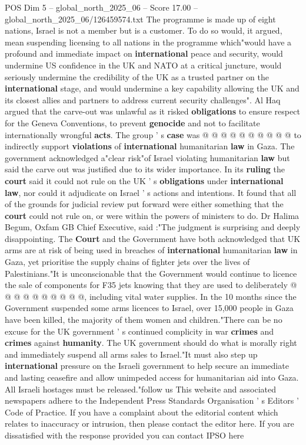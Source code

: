 \begin{textsample}{POS Dim 5 – global\_north\_2025\_06 – Score 17.00 – global\_north\_2025\_06/126459574.txt}
The programme is made up of eight nations, Israel is not a member but is a customer.
To do so would, it argued, mean suspending licensing to all nations in the programme which"would have a profound and immediate impact on \textbf{international} peace and security, would undermine US confidence in the UK and NATO at a critical juncture, would seriously undermine the credibility of the UK as a trusted partner on the \textbf{international} stage, and would undermine a key capability allowing the UK and its closest allies and partners to address current security challenges".
Al Haq argued that the carve-out was unlawful as it risked \textbf{obligations} to ensure respect for the Geneva Conventions, to prevent \textbf{genocide} and not to facilitate internationally wrongful \textbf{acts}.
The group ' s \textbf{case} was @ @ @ @ @ @ @ @ @ @ to indirectly support \textbf{violations} of \textbf{international} humanitarian \textbf{law} in Gaza.
The government acknowledged a"clear risk"of Israel violating humanitarian \textbf{law} but said the carve out was justified due to its wider importance.
In its \textbf{ruling} the \textbf{court} said it could not rule on the UK ' s \textbf{obligations} under \textbf{international} \textbf{law}, nor could it adjudicate on Israel ' s actions and intentions.
It found that all of the grounds for judicial review put forward were either something that the \textbf{court} could not rule on, or were within the powers of ministers to do.
Dr Halima Begum, Oxfam GB Chief Executive, said :"The judgment is surprising and deeply disappointing.
The \textbf{Court} and the Government have both acknowledged that UK arms are at risk of being used in breaches of \textbf{international} humanitarian \textbf{law} in Gaza, yet prioritise the supply chains of fighter jets over the lives of Palestinians."It is unconscionable that the Government would continue to licence the sale of components for F35 jets knowing that they are used to deliberately @ @ @ @ @ @ @ @ @ @, including vital water supplies.
In the 10 months since the Government suspended some arms licences to Israel, over 15,000 people in Gaza have been killed, the majority of them women and children."There can be no excuse for the UK government ' s continued complicity in war \textbf{crimes} and \textbf{crimes} against \textbf{humanity}.
The UK government should do what is morally right and immediately suspend all arms sales to Israel."It must also step up \textbf{international} pressure on the Israeli government to help secure an immediate and lasting ceasefire and allow unimpeded access for humanitarian aid into Gaza.
All Israeli hostages must be released."follow us This website and associated newspapers adhere to the Independent Press Standards Organisation ' s Editors ' Code of Practice.
If you have a complaint about the editorial content which relates to inaccuracy or intrusion, then please contact the editor here.
If you are dissatisfied with the response provided you can contact IPSO here

\end{textsample}
